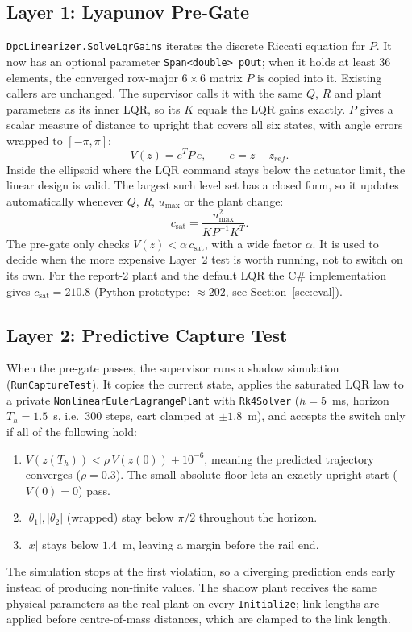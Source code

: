 \documentclass[11pt,a4paper]{article}
\newcommand{\code}[1]{\texttt{#1}}
\newcommand{\csat}{c_{\mathrm{sat}}}
\newcommand{\umax}{u_{\max}}
\begin{document}
\subsection{Layer 1: Lyapunov Pre-Gate}
\code{DpcLinearizer.SolveLqrGains} iterates the discrete Riccati equation for $P$. It now has an
optional parameter \code{Span<double> pOut}; when it holds at least 36 elements, the converged
row-major $6\times 6$ matrix $P$ is copied into it. Existing callers are unchanged. The
supervisor calls it with the same $Q$, $R$ and plant parameters as its inner LQR, so its $K$
equals the LQR gains exactly. $P$ gives a scalar measure of distance to upright that covers
all six states, with angle errors wrapped to $[-\pi,\pi]$:
\[
V(z) = e^{T} P\, e, \qquad e = z - z_{ref}.
\]
Inside the ellipsoid where the LQR command stays below the actuator limit, the linear design
is valid. The largest such level set has a closed form, so it updates automatically whenever
$Q$, $R$, $\umax$ or the plant change:
\[
\csat = \frac{\umax^{2}}{K P^{-1} K^{T}}.
\]
The pre-gate only checks $V(z) < \alpha\,\csat$, with a wide factor $\alpha$. It is used to
decide when the more expensive Layer~2 test is worth running, not to switch on its own. For the
report-2 plant and the default LQR the C\# implementation gives $\csat = 210.8$ (Python
prototype: $\approx 202$, see Section~\ref{sec:eval}).

\subsection{Layer 2: Predictive Capture Test}
When the pre-gate passes, the supervisor runs a shadow simulation (\code{RunCaptureTest}). It
copies the current state, applies the saturated LQR law to a private
\code{NonlinearEulerLagrangePlant} with \code{Rk4Solver} ($h = 5$~ms, horizon
$T_h = 1.5$~s, i.e.\ 300 steps, cart clamped at $\pm 1.8$~m), and accepts the switch only if
all of the following hold:
\begin{enumerate}
\item $V(z(T_h)) < \rho\, V(z(0)) + 10^{-6}$, meaning the predicted trajectory converges
($\rho = 0.3$). The small absolute floor lets an exactly upright start ($V(0) = 0$) pass.
\item $|\theta_1|, |\theta_2|$ (wrapped) stay below $\pi/2$ throughout the horizon.
\item $|x|$ stays below $1.4$~m, leaving a margin before the rail end.
\end{enumerate}
The simulation stops at the first violation, so a diverging prediction ends early instead of
producing non-finite values. The shadow plant receives the same physical parameters as the
real plant on every \code{Initialize}; link lengths are applied before centre-of-mass
distances, which are clamped to the link length.
\end{document}

